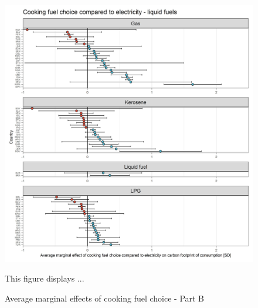 \documentclass[12pt, a4paper]{article}
\newenvironment{subcaption}
{\strut
\vspace{-5pt}
\begin{minipage}[b]{0.9\textwidth}
  \hspace*{-\parindent}
  \footnotesize}
 {\end{minipage}}
\begin{document}
\begin{figure}[ht!]
  \centering
 \caption{Average marginal effects of cooking fuel choice - Part B} \label{fig:D7_Electricity_B}
  \includegraphics{Analysis_OLS_ME_Carbon_Footprint/AME_OLS_FP_CF_Electricity B}
  \begin{subcaption}
    This figure displays ...
  \end{subcaption}

\end{figure}

\clearpage
\end{document}
